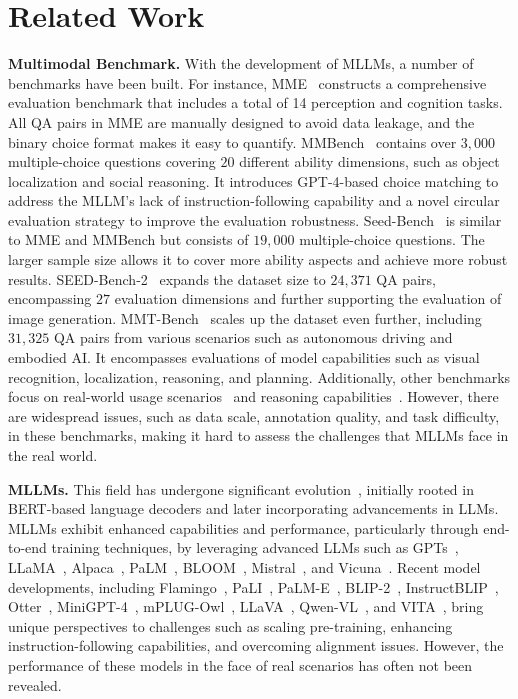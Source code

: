 \section{Related Work}
\textbf{Multimodal Benchmark.} 
With the development of MLLMs, a number of benchmarks have been built.
For instance, MME~\citep{fu2023mme} constructs a comprehensive evaluation benchmark that includes a total of 14 perception and cognition tasks. All QA pairs in MME are manually designed to avoid data leakage, and the binary choice format makes it easy to quantify.
MMBench~\citep{liu2023mmbench} contains over $3,000$ multiple-choice questions covering $20$ different ability dimensions, such as object localization and social reasoning. 
It introduces GPT-4-based choice matching to address the MLLM's lack of instruction-following capability and a novel circular evaluation strategy to improve the evaluation robustness.
Seed-Bench~\citep{li2023seed} is similar to MME and MMBench but consists of $19,000$ multiple-choice questions. The larger sample size allows it to cover more ability aspects and achieve more robust results.
SEED-Bench-2~\citep{li2023seed2} expands the dataset size to $24,371$ QA pairs, encompassing $27$ evaluation dimensions and further supporting the evaluation of image generation.
MMT-Bench~\citep{mmtbench} scales up the dataset even further, including $31,325$ QA pairs from various scenarios such as autonomous driving and embodied AI. It encompasses evaluations of model capabilities such as visual recognition, localization, reasoning, and planning.
Additionally, other benchmarks focus on real-world usage scenarios~\citep{fu2024blink,lu2024wildvision,bitton2023visit} and reasoning capabilities~\citep{yu2024mm,bai2023touchstone,han2023coremm}. 
However, there are widespread issues, such as data scale, annotation quality, and task difficulty, in these benchmarks, making it hard to assess the challenges that MLLMs face in the real world.

\textbf{MLLMs.} 
This field has undergone significant evolution~\citep{yin2023survey, fu2023challenger}, initially rooted in BERT-based language decoders and later incorporating advancements in LLMs. 
MLLMs exhibit enhanced capabilities and performance, particularly through end-to-end training techniques, by leveraging advanced LLMs such as GPTs~\citep{gpt4,brown2020language},
LLaMA~\citep{touvron2023llama,touvron2023llama2}, 
Alpaca~\citep{taori2023stanford}, PaLM~\citep{chowdhery2023palm,anil2023palm}, BLOOM~\citep{muennighoff2022crosslingual}, 
Mistral~\citep{jiang2023mistral}, and Vicuna~\citep{chiang2023vicuna}. Recent model developments, including Flamingo~\citep{awadalla2023openflamingo}, PaLI~\citep{laurenccon2024obelics}, PaLM-E~\citep{driess2023palm}, BLIP-2~\citep{li2023blip}, InstructBLIP~\citep{dai2024instructblip}, Otter~\citep{li2023otter}, MiniGPT-4~\citep{zhu2023minigpt}, mPLUG-Owl~\citep{ye2023mplug}, LLaVA~\citep{liu2023visual}, Qwen-VL~\citep{bai2023qwen}, and VITA~\citep{fu2024vita}, bring unique perspectives to challenges such as scaling pre-training, enhancing instruction-following capabilities, and overcoming alignment issues. 
However, the performance of these models in the face of real scenarios has often not been revealed.


